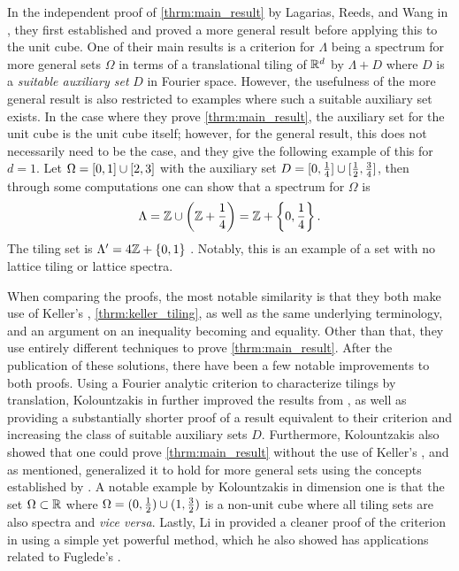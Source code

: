 \documentclass[../thesis.tex]{subfiles}
\begin{document}
In the independent proof of \cref{thrm:main_result} by Lagarias, Reeds, and Wang in \cite{lagariasOrthonormalBasesExponentials2000}, they first established and proved a more general result before applying this to the unit cube. One of their main results is a criterion for $\Lambda$ being a spectrum for more general sets $\Omega$ in terms of a translational tiling of $\mathbb{R}^d$ by $\Lambda+D$ where $D$ is a \emph{suitable auxiliary set} $D$ in Fourier space. However, the usefulness of the more general result is also restricted to examples where such a suitable auxiliary set exists. In the case where they prove \cref{thrm:main_result}, the auxiliary set for the unit cube is the unit cube itself; however, for the general result, this does not necessarily need to be the case, and they give the following example of this for $d=1$. Let $\Omega = [0,1] \cup [2,3]$ with the auxiliary set $D=[0,\frac{1}{4}]\cup[\frac{1}{2},\frac{3}{4}]$, then through some computations one can show that a spectrum for $\Omega$ is 
\begin{equation*}
    \Lambda = \mathbb{Z} \cup \left(\mathbb{Z}+\frac{1}{4}\right) = \mathbb{Z}+\left\{0,\frac{1}{4}\right\}.
\end{equation*} 
The tiling set is $\Lambda'=4\mathbb{Z} +\{0,1\}$ \cite{liuUniformityNonUniformGabor2003}. Notably, this is an example of a set with no lattice tiling or lattice spectra. %

When comparing the proofs, the most notable similarity is that they both make use of Keller's , \cref{thrm:keller_tiling}, as well as the same underlying terminology, and an argument on an inequality becoming and equality. Other than that, they use entirely different techniques to prove \cref{thrm:main_result}. After the publication of these solutions, there have been a few notable improvements to both proofs. Using a Fourier analytic criterion to characterize tilings by translation, Kolountzakis in \cite{kolountzakisPackingTilingOrthogonality2000} further improved the results from \cite{lagariasOrthonormalBasesExponentials2000}, as well as providing a substantially shorter proof of a result equivalent to their criterion and increasing the class of suitable auxiliary sets $D$. Furthermore, Kolountzakis also showed that one could prove \cref{thrm:main_result} without the use of Keller's , and as mentioned, generalized it to hold for more general sets using the concepts established by \cite{lagariasOrthonormalBasesExponentials2000}. A notable example by Kolountzakis in dimension one is that the set $\Omega\subset \mathbb{R}$ where $\Omega = (0,\frac{1}{2}) \cup  (1,\frac{3}{2})$ is a non-unit cube where all tiling sets are also spectra and \emph{vice versa}. Lastly, Li in \cite{liCharacterizationsSpectraTilings2004}  provided a cleaner proof of the criterion in \cite{kolountzakisPackingTilingOrthogonality2000} using a simple yet powerful method, which he also showed has applications related to Fuglede's . 
\end{document}
